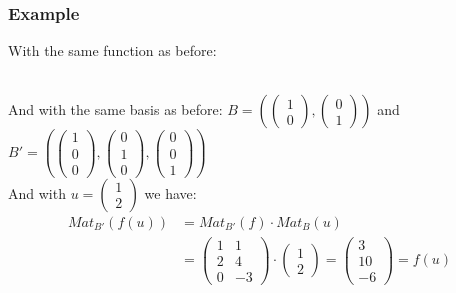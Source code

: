 \documentclass[notitlepage]{math}
\begin{document}
\subsubsection{Example}
With the same function as before: \\
\\
And with the same basis as before:
$B = (\begin{pmatrix} 1 \\ 0 \end{pmatrix}, \begin{pmatrix} 0 \\ 1 \end{pmatrix})$ and $B' = (\begin{pmatrix} 1 \\ 0 \\ 0 \end{pmatrix}, \begin{pmatrix} 0 \\ 1 \\ 0 \end{pmatrix}, \begin{pmatrix} 0 \\ 0 \\ 1 \end{pmatrix})$ \\

And with $u = \begin{pmatrix} 1 \\ 2 \end{pmatrix}$ we have:
\begin{align*}
    Mat_{B'}(f(u)) &= Mat_{B'}(f) \cdot Mat_{B}(u) \\
     &= \begin{pmatrix}
        1 & 1 \\
        2 & 4 \\
        0 & -3
    \end{pmatrix} \cdot \begin{pmatrix}
        1 \\
        2
    \end{pmatrix} 
    = \begin{pmatrix}
        3 \\
        10 \\
        -6
    \end{pmatrix} = f(u)
\end{align*}
\end{document}
